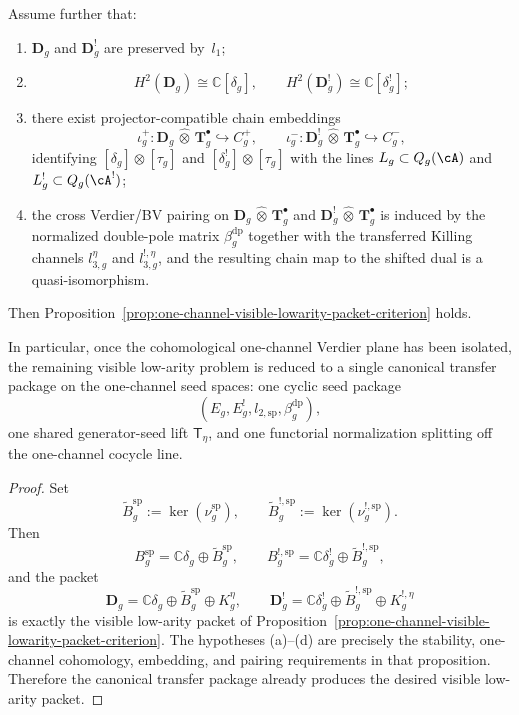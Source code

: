 \begin{proposition}
\[\]
Assume further that:
\begin{enumerate}[label=\textup{(\alph*)}]
\item $\mathbf{D}_g$ and $\mathbf{D}_g^!$ are preserved by~$l_1$;
\item
  \[
  H^2(\mathbf{D}_g)\cong \mathbb{C}[\delta_g],
  \qquad
  H^2(\mathbf{D}_g^!)\cong \mathbb{C}[\delta_g^!];
  \]
\item there exist projector-compatible chain embeddings
  \[
  \iota_g^+ \colon
  \mathbf{D}_g \,\widehat{\otimes}\, \mathbf{T}_g^\bullet
  \hookrightarrow C_g^+,
  \qquad
  \iota_g^- \colon
  \mathbf{D}_g^! \,\widehat{\otimes}\, \mathbf{T}_g^\bullet
  \hookrightarrow C_g^-,
  \]
  identifying
  $[\delta_g]\otimes[\tau_g]$ and
  $[\delta_g^!]\otimes[\tau_g]$ with the lines
  $L_g \subset Q_g(\cA)$ and
  $L_g^! \subset Q_g(\cA^!)$;
\item the cross Verdier/BV pairing on
  $\mathbf{D}_g \,\widehat{\otimes}\, \mathbf{T}_g^\bullet$ and
  $\mathbf{D}_g^! \,\widehat{\otimes}\, \mathbf{T}_g^\bullet$
  is induced by the normalized double-pole matrix
  $\beta_g^{\mathrm{dp}}$ together with the transferred Killing
  channels $l_{3,g}^\eta$ and $l_{3,g}^{!,\eta}$, and the resulting
  chain map to the shifted dual is a quasi-isomorphism.
\end{enumerate}
Then Proposition~\ref{prop:one-channel-visible-lowarity-packet-criterion}
holds.

In particular, once the cohomological one-channel Verdier plane has
been isolated, the remaining visible low-arity problem is reduced to a
single canonical transfer package on the one-channel seed spaces:
one cyclic seed package
\[
(E_g,E_g^!,l_{2,\mathrm{sp}},\beta_g^{\mathrm{dp}}),
\]
one shared generator-seed lift $\mathsf{T}_\eta$, and one functorial
normalization splitting off the one-channel cocycle line.
\end{proposition}

\begin{proof}
Set
\[
\widetilde{B}_g^{\mathrm{sp}} := \ker(\nu_g^{\mathrm{sp}}),
\qquad
\widetilde{B}_g^{!,\mathrm{sp}} := \ker(\nu_g^{!,\mathrm{sp}}).
\]
Then
\[
B_g^{\mathrm{sp}}
=
\mathbb{C}\delta_g \oplus \widetilde{B}_g^{\mathrm{sp}},
\qquad
B_g^{!,\mathrm{sp}}
=
\mathbb{C}\delta_g^! \oplus \widetilde{B}_g^{!,\mathrm{sp}},
\]
and the packet
\[
\mathbf{D}_g
=
\mathbb{C}\delta_g \oplus \widetilde{B}_g^{\mathrm{sp}} \oplus K_g^\eta,
\qquad
\mathbf{D}_g^!
=
\mathbb{C}\delta_g^! \oplus \widetilde{B}_g^{!,\mathrm{sp}} \oplus K_g^{!,\eta}
\]
is exactly the visible low-arity packet of
Proposition~\ref{prop:one-channel-visible-lowarity-packet-criterion}.
The hypotheses \textup{(a)}--\textup{(d)} are precisely the stability,
one-channel cohomology, embedding, and pairing requirements in that
proposition.  Therefore the canonical transfer package already
produces the desired visible low-arity packet.
\end{proof}


